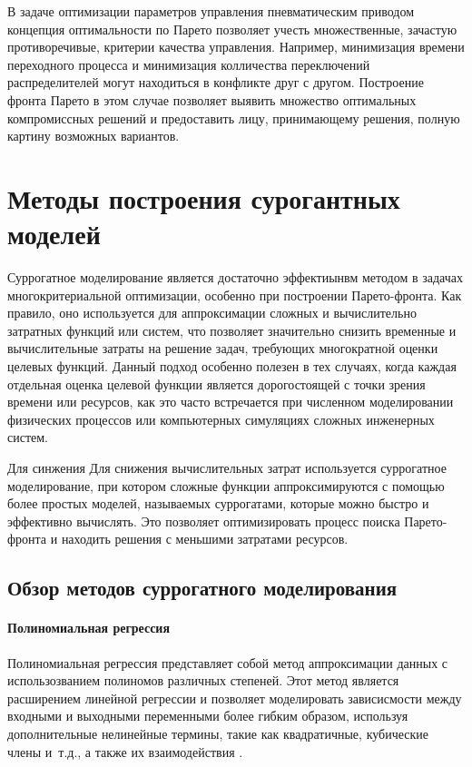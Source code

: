 В задаче оптимизации параметров управления пневматическим приводом концепция оптимальности
по Парето позволяет учесть множественные, зачастую противоречивые, критерии качества управления.
Например, минимизация времени переходного процесса и минимизация колличества переключений распределителей
могут находиться в конфликте друг с другом. Построение фронта Парето в этом случае
позволяет выявить множество оптимальных компромиссных решений и
предоставить лицу, принимающему решения, полную картину возможных вариантов.



\section{Методы построения сурогантных моделей}\label{sec:ch4/sec2}
Суррогатное моделирование является достаточно эффектиынвм методом в
задачах многокритериальной оптимизации, особенно при построении
Парето-фронта. Как правило, оно используется для аппроксимации сложных и вычислительно
затратных функций или систем, что позволяет значительно снизить временные и вычислительные
затраты на решение задач, требующих многократной оценки целевых функций. Данный
подход особенно полезен в тех случаях, когда каждая отдельная оценка целевой функции
является дорогостоящей с точки зрения времени или ресурсов, как это часто встречается
при численном моделировании физических процессов или компьютерных симуляциях сложных
инженерных систем.

Для синжения Для снижения вычислительных затрат используется суррогатное моделирование,
при котором сложные функции аппроксимируются с помощью более простых моделей,
называемых суррогатами, которые можно быстро и эффективно вычислять.
Это позволяет оптимизировать процесс поиска Парето-фронта и находить решения
с меньшими затратами ресурсов.



\subsection{Обзор методов суррогатного моделирования}\label{sec:ch4/sec2/subsec1}


\paragraph{Полиномиальная регрессия}\label{sec:ch4/sec2/subsec1/subsubsec1}

Полиномиальная регрессия представляет собой метод аппроксимации данных
с использозванием полиномов различных степеней. Этот метод является расширением линейной
регрессии и позволяет моделировать зависисмости между входными и выходными переменными более
гибким образом, используя дополнительные нелинейные термины, такие как квадратичные, кубические члены
и~т.д., а также их взаимодействия \cite{fan2018local}.

